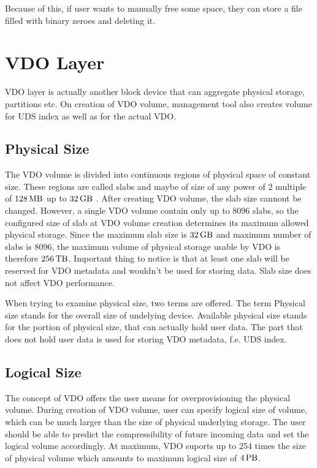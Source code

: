 \documentclass[
  color, %
  table, %
  lof,   %
  lot,   %
]{fithesis3}
\begin{document}
Because of this, if user wants to manually free some space, they can store a file filled with binary zeroes and deleting it.


\section{VDO Layer}
VDO layer is actually another block device that can aggregate physical storage, partitions etc. On creation of VDO volume, management tool also creates volume for UDS index as well as for the actual VDO. 

\subsection{Physical Size}
The VDO volume is divided into continuous regions of physical space of constant size. These regions are called slabs and maybe of size of any power of 2 multiple of $\SI{128}{\mega\byte}$  up to $\SI{32}{\giga\byte}$ . After creating VDO volume, the slab size cannont be changed. However, a single VDO volume contain only up to 8096 slabs, so the configured size of slab at VDO volume creation determines its maximum allowed physical storage. Since the maximum slab size is $\SI{32}{\giga\byte}$ and maximum number of slabs is 8096, the maximum volume of physical storage usable by VDO is therefore $\SI{256}{\tera\byte}$. Important thing to notice is that at least one slab will be reserved for VDO metadata and wouldn't be used for storing data. Slab size does not affect VDO performance.

When trying to examine physical size, two terms are offered. The term Physical size stands for the overall size of undelying device. Available physical size stands for the portion of physical size, that can actually hold user data. The part that does not hold user data is used for storing VDO metadata, f.e. UDS index.

\subsection{Logical Size}
The concept of VDO offers the user means for overprovisioning the physical volume. During creation of VDO volume, user can specify logical size of volume, which can be much larger than the size of physical underlying storage. The user should be able to predict the compressibility of future incoming data and set the logical volume accordingly. At maximum, VDO suports up to 254 times the size of physical volume which amounts to maximum logical size of $\SI{4}{\peta\byte}$.
\end{document}
